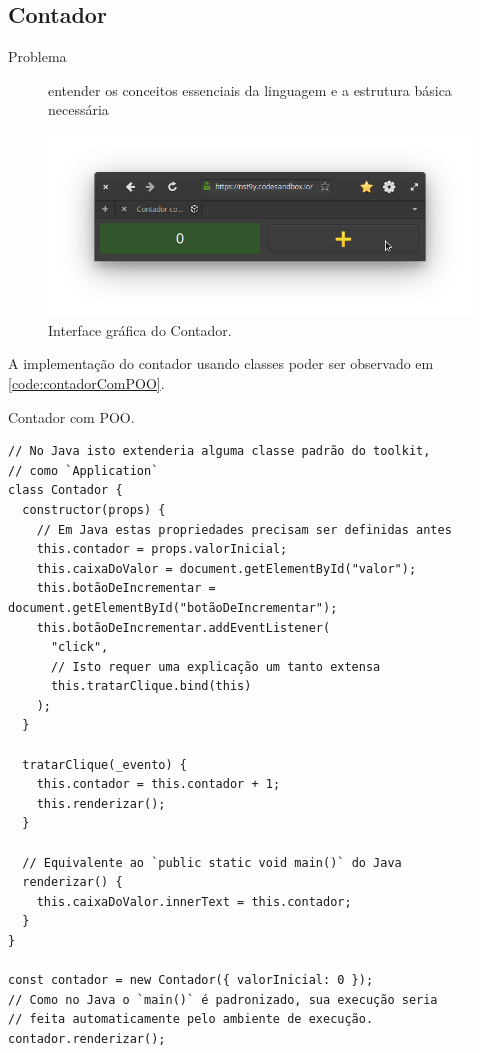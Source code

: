 \subsection{Contador}
\label{sec:org8ed5085}

\begin{description}
\item[{Problema}] entender os conceitos essenciais da linguagem e a estrutura
básica necessária
\end{description}

\begin{figure}[htbp]
\caption{\label{img:contador}Interface gráfica do Contador.}
\centering
\includegraphics[width=12cm]{./fig/screenshot-contador-epiphany.png}
\end{figure}

A implementação do contador usando classes poder ser observado em
\ref{code:contadorComPOO}.

\begin{listing}[htbp]
\caption{\label{code:contadorComPOO}Contador com POO.}
\begin{verbatim}
// No Java isto extenderia alguma classe padrão do toolkit,
// como `Application`
class Contador {
  constructor(props) {
    // Em Java estas propriedades precisam ser definidas antes
    this.contador = props.valorInicial;
    this.caixaDoValor = document.getElementById("valor");
    this.botãoDeIncrementar = document.getElementById("botãoDeIncrementar");
    this.botãoDeIncrementar.addEventListener(
      "click",
      // Isto requer uma explicação um tanto extensa
      this.tratarClique.bind(this)
    );
  }

  tratarClique(_evento) {
    this.contador = this.contador + 1;
    this.renderizar();
  }

  // Equivalente ao `public static void main()` do Java
  renderizar() {
    this.caixaDoValor.innerText = this.contador;
  }
}

const contador = new Contador({ valorInicial: 0 });
// Como no Java o `main()` é padronizado, sua execução seria
// feita automaticamente pelo ambiente de execução.
contador.renderizar();
\end{verbatim}
\end{listing}

